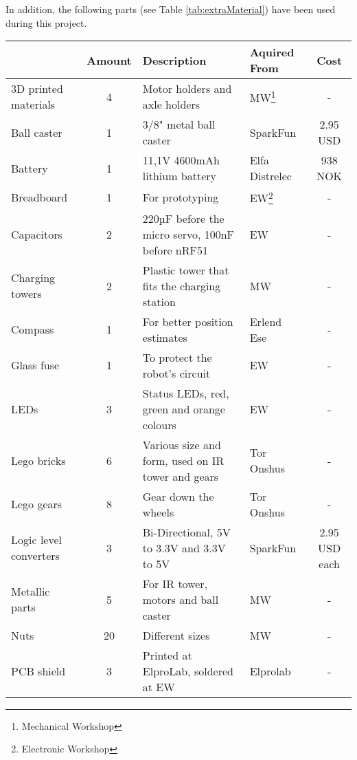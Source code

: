In addition, the following parts (see Table \ref{tab:extraMaterial}) have been used during this project.

\begin{sidewaystable}[ht]
\centering
\caption{Extra Material}
\label{tab:extraMaterial}
\begin{tabular}{|l|c|l|l|c|}
\hline
\rowcolor[HTML]{C0C0C0} 
\multicolumn{1}{|l|}{\cellcolor[HTML]{C0C0C0}\textbf{Part}} & \multicolumn{1}{l|}{\cellcolor[HTML]{C0C0C0}\textbf{Amount}} & \multicolumn{1}{l|}{\cellcolor[HTML]{C0C0C0}\textbf{Description}} & \multicolumn{1}{l|}{\cellcolor[HTML]{C0C0C0}\textbf{Aquired From}} & \multicolumn{1}{c|}{\cellcolor[HTML]{C0C0C0}\textbf{Cost}} \\ \hline
3D printed materials & 4 & Motor  holders and axle holders & MW\footnote{Mechanical Workshop} & - \\
Ball caster & 1 & 3/8" metal ball caster & SparkFun & 2.95 USD \\
Battery & 1 & 11,1V 4600mAh lithium battery & Elfa Distrelec & 938 NOK \\
Breadboard & 1 & For prototyping & EW\footnote{Electronic Workshop} & - \\
Capacitors & 2 & 220µF before the micro servo, 100nF before nRF51 & EW & - \\
Charging towers & 2 & Plastic tower that fits the charging station & MW & - \\
Compass & 1 & For better position estimates & Erlend Ese & - \\
Glass fuse & 1 & To protect the robot's circuit & EW & - \\
LEDs & 3 & Status LEDs, red, green and orange colours & EW & - \\
Lego bricks & 6 & Various size and form, used on IR tower and gears & Tor Onshus & - \\
Lego gears & 8 & Gear down the wheels & Tor Onshus & - \\
Logic level converters & 3 & Bi-Directional, 5V to 3.3V and 3.3V to 5V & SparkFun & 2.95 USD each \\
Metallic parts & 5 & For IR tower, motors and ball caster & MW & - \\
Nuts & 20 & Different sizes & MW & - \\
PCB shield & 3 & Printed at ElproLab, soldered at EW & Elprolab & - \\

\end{tabular}
\end{sidewaystable}
